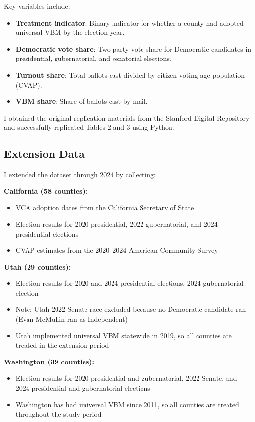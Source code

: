 \documentclass[12pt]{article}
\begin{document}
Key variables include:
\begin{itemize}
    \item \textbf{Treatment indicator}: Binary indicator for whether a county had adopted universal VBM by the election year.
    \item \textbf{Democratic vote share}: Two-party vote share for Democratic candidates in presidential, gubernatorial, and senatorial elections.
    \item \textbf{Turnout share}: Total ballots cast divided by citizen voting age population (CVAP).
    \item \textbf{VBM share}: Share of ballots cast by mail.
\end{itemize}

I obtained the original replication materials from the Stanford Digital Repository and successfully replicated Tables 2 and 3 using Python.

\subsection{Extension Data}

I extended the dataset through 2024 by collecting:

\textbf{California (58 counties):}
\begin{itemize}
    \item VCA adoption dates from the California Secretary of State
    \item Election results for 2020 presidential, 2022 gubernatorial, and 2024 presidential elections
    \item CVAP estimates from the 2020--2024 American Community Survey
\end{itemize}

\textbf{Utah (29 counties):}
\begin{itemize}
    \item Election results for 2020 and 2024 presidential elections, 2024 gubernatorial election
    \item Note: Utah 2022 Senate race excluded because no Democratic candidate ran (Evan McMullin ran as Independent)
    \item Utah implemented universal VBM statewide in 2019, so all counties are treated in the extension period
\end{itemize}

\textbf{Washington (39 counties):}
\begin{itemize}
    \item Election results for 2020 presidential and gubernatorial, 2022 Senate, and 2024 presidential and gubernatorial elections
    \item Washington has had universal VBM since 2011, so all counties are treated throughout the study period
\end{itemize}
\end{document}
